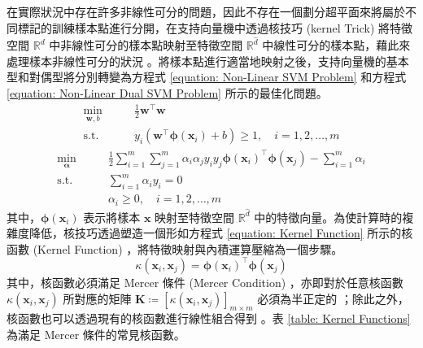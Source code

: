 在實際狀況中存在許多非線性可分的問題，因此不存在一個劃分超平面來將屬於不同標記的訓練樣本點進行分開，在支持向量機中透過核技巧 (kernel Trick) 將特徵空間 $\mathbb{R}^{d}$ 中非線性可分的樣本點映射至特徵空間 $\mathbb{R}^{\hat{d}}$ 中線性可分的樣本點，藉此來處理樣本非線性可分的狀況 \cite{boser1992training}。將樣本點進行適當地映射之後，支持向量機的基本型和對偶型將分別轉變為方程式 \eqref{equation: Non-Linear SVM Problem} 和方程式 \eqref{equation: Non-Linear Dual SVM Problem} 所示的最佳化問題。
%
\begin{equation}\label{equation: Non-Linear SVM Problem}
  \begin{aligned}
    \min_{\boldsymbol{w}, b} \qquad & \frac{1}{2} \boldsymbol{w}^{\top} \boldsymbol{w} \\
    \text{s.t.}              \qquad & y_{i} (\boldsymbol{w}^{\top} \boldsymbol{\phi} (\boldsymbol{x}_{i}) + b ) \geq 1 ,\quad i = 1, 2, \ldots, m
  \end{aligned}
\end{equation}
%
\begin{equation}\label{equation: Non-Linear Dual SVM Problem}
  \begin{aligned}
    \min_{\boldsymbol{\alpha}} \qquad & \frac{1}{2} \sum_{i = 1}^{m} \sum_{j = 1}^{m} \alpha_i \alpha_j y_i y_j \boldsymbol{\phi} (\boldsymbol{x}_{i})^{\top} \boldsymbol{\phi} (\boldsymbol{x}_{j}) - \sum_{i = 1}^{m} \alpha_{i} \\
    \text{s.t.}                \qquad & \sum_{i = 1}^{m} \alpha_{i} y_{i} = 0 \\
    \qquad                            & \alpha_{i} \geq 0 ,\quad i = 1, 2, \ldots, m
  \end{aligned}
\end{equation}
%
其中，$\boldsymbol{\phi} (\boldsymbol{x}_{i})$ 表示將樣本 $\boldsymbol{x}$ 映射至特徵空間 $\mathbb{R}^{\hat{d}}$ 中的特徵向量。為使計算時的複雜度降低，核技巧透過塑造一個形如方程式 \eqref{equation: Kernel Function} 所示的核函數 (Kernel Function) ，將特徵映射與內積運算壓縮為一個步驟。
%
\begin{equation}\label{equation: Kernel Function}
  \kappa (\boldsymbol{x}_{i}, \boldsymbol{x}_{j}) = \boldsymbol{\phi} (\boldsymbol{x}_{i})^{\top} \boldsymbol{\phi} (\boldsymbol{x}_{j})
\end{equation}
%
其中，核函數必須滿足 Mercer 條件 (Mercer Condition) ，亦即對於任意核函數 $\kappa (\boldsymbol{x}_{i}, \boldsymbol{x}_{j})$ 所對應的矩陣 $\boldsymbol{K} \coloneqq [\kappa (\boldsymbol{x}_{i}, \boldsymbol{x}_{j})]_{m \times m} $ 必須為半正定的 \cite{cristianini2000introduction}；除此之外，核函數也可以透過現有的核函數進行線性組合得到 \cite{lanckriet2004learning}。表 \ref{table: Kernel Functions} 為滿足 Mercer 條件的常見核函數。

